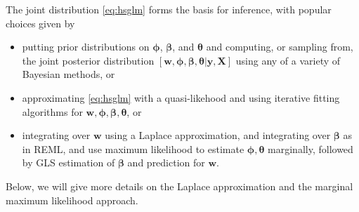 \documentclass[12pt, titlepage]{article}
\begin{document}
The joint distribution \ref{eq:hsglm} forms the basis for inference, with popular choices given by
\begin{itemize}
\item putting prior distributions on $\boldsymbol{\phi}$, $\boldsymbol{\beta}$, and $\boldsymbol{\theta}$ and computing, or sampling from, the joint posterior distribution $[\mathbf{w},\boldsymbol{\phi},\boldsymbol{\beta},\boldsymbol{\theta}|\mathbf{y},\mathbf{X}]$ using any of a variety of Bayesian methods, or 
\item approximating \eqref{eq:hsglm} with a quasi-likehood and using iterative fitting algorithms for $\mathbf{w},\boldsymbol{\phi},\boldsymbol{\beta},\boldsymbol{\theta}$, or
\item integrating over $\mathbf{w}$ using a Laplace approximation, and integrating over $\boldsymbol{\beta}$ as in REML, and use maximum likelihood to estimate $\boldsymbol{\phi},\boldsymbol{\theta}$ marginally, followed by GLS estimation of $\boldsymbol{\beta}$ and prediction for $\mathbf{w}$.
\end{itemize}

Below, we will give more details on the Laplace approximation and the marginal maximum likelihood approach.




\end{document}
